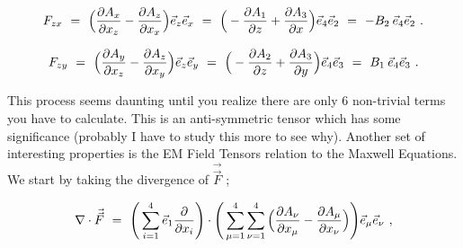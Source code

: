 \documentclass{article}
\begin{document}
\begin{equation} \label{eb-eq-1002-32}
F_{z x} \hspace{0.125cm} = \hspace{0.125cm}  \Big( \frac{\partial{A_{x}}}{\partial{x_{z}}} - \frac{\partial{A_{z}}}{\partial{x_{x}}} \Big) \vec{e}_{z} \vec{e}_{x} \hspace{0.125cm} = \hspace{0.125cm} \Big( - \frac{\partial{A_{1}}}{\partial{z}} + \frac{\partial{A_{3}}}{\partial{x}} \Big) \vec{e}_{4} \vec{e}_{2} \hspace{0.125cm} = \hspace{0.125cm} - B_2 \hspace{0.075cm} \vec{e}_{4} \vec{e}_{2} \hspace{0.125cm} .
\end{equation}

\begin{equation} \label{eb-eq-1002-33}
F_{z y} \hspace{0.125cm} = \hspace{0.125cm}  \Big( \frac{\partial{A_{y}}}{\partial{x_{z}}} - \frac{\partial{A_{z}}}{\partial{x_{y}}} \Big) \vec{e}_{z} \vec{e}_{y} \hspace{0.125cm} = \hspace{0.125cm} \Big( - \frac{\partial{A_{2}}}{\partial{z}} + \frac{\partial{A_{3}}}{\partial{y}} \Big) \vec{e}_{4} \vec{e}_{3} \hspace{0.125cm} = \hspace{0.125cm} B_1 \hspace{0.075cm} \vec{e}_{4} \vec{e}_{3} \hspace{0.125cm} .
\end{equation}

This process seems daunting until you realize there are only 6 non-trivial terms you have to calculate. This is an anti-symmetric tensor which has some significance (probably I have to study this more to see why). Another set of interesting properties is the EM Field Tensors relation to the Maxwell Equations. We start by taking the divergence of \begin{math} \vec{\vec{F}} \end{math} ;

\begin{equation} \label{eb-eq-1002-34}
\nabla \cdot \vec{\vec{F}} \hspace{0.125cm} = \hspace{0.125cm}  \Bigg( \sum_{i = 1}^{4} \vec{e}_1 \frac{\partial}{\partial{x_i}} \Bigg) \cdot \Bigg( \sum_{\mu = 1}^{4} \sum_{\nu = 1}^{4} \Big( \frac{\partial{A_{\nu}}}{\partial{x_{\mu}}} - \frac{\partial{A_{\mu}}}{\partial{x_{\nu}}} \Big) \Bigg)  \vec{e}_{\mu} \vec{e}_{\nu} \hspace{0.125cm} ,
\end{equation}
\end{document}
